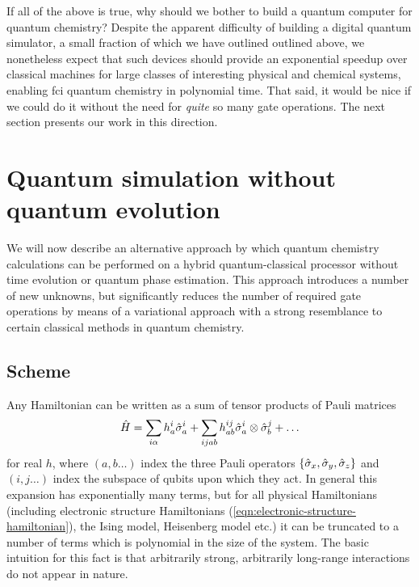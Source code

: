 If all of the above is true, why should we bother to build a quantum computer for quantum chemistry?
Despite the apparent difficulty of building a digital quantum simulator, a small fraction of which we have outlined outlined above, we nonetheless expect that such devices should provide an exponential speedup over classical machines for large classes of interesting physical and chemical systems, enabling \gls{fci} quantum chemistry in polynomial time. That said, it would be nice if we could do it without the need for \emph{quite} so many gate operations. The next section presents our work in this direction.

\section{Quantum simulation without quantum evolution} 

We will now describe an alternative approach by which quantum chemistry calculations can be performed on a hybrid quantum-classical processor without time evolution or quantum phase estimation. This approach introduces a number of new unknowns, but significantly reduces the number of required gate operations by means of a variational approach with a strong resemblance to certain classical methods in quantum chemistry.

\subsection{Scheme}
Any Hamiltonian can be written as a sum of tensor products of Pauli matrices
\begin{equation}
    \hat{H} = 
    \sum_{i\alpha} h_a ^ i \hat{\sigma}_a ^ i +
    \sum_{i j a b} h_{a b} ^ {ij} \hat{\sigma}_a^i \otimes \hat{\sigma}_b^j + 
    \ldots
\end{equation}
for real $h$, where $(a, b \ldots)$ index the three Pauli operators $\{ \hat{\sigma}_x, \hat{\sigma}_y, \hat{\sigma}_z \}$ and $(i, j \ldots)$ index the subspace of qubits upon which they act. In general this expansion has exponentially many terms, but for all physical Hamiltonians (including electronic structure Hamiltonians (\ref{eqn:electronic-structure-hamiltonian}), the Ising model, Heisenberg model etc.)  it can be truncated to a number of terms which is polynomial in the size of the system. The basic intuition for this fact is that arbitrarily strong, arbitrarily long-range interactions do not appear in nature.  

